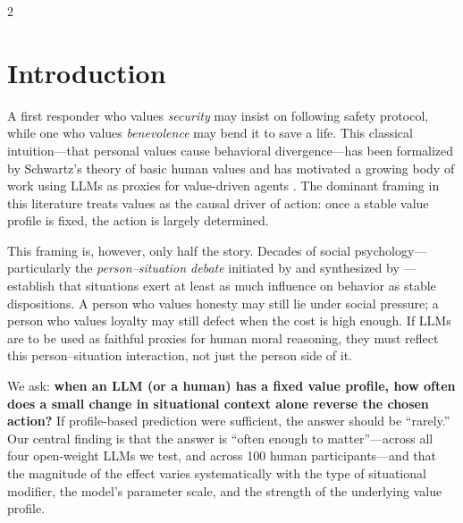 \documentclass[11pt]{article}
\begin{document}
\begin{multicols}{2}

\section{Introduction}
\label{sec:intro}

A first responder who values \emph{security} may insist on following safety protocol, while one who values \emph{benevolence} may bend it to save a life. This classical intuition---that personal values cause behavioral divergence---has been formalized by Schwartz's theory of basic human values \citep{schwartz1992universals, schwartz2012refined} and has motivated a growing body of work using LLMs as proxies for value-driven agents \citep{sorensen2024value, kang2023values, abdulhai2023moral, vista2025}. The dominant framing in this literature treats values as the causal driver of action: once a stable value profile is fixed, the action is largely determined.

This framing is, however, only half the story. Decades of social psychology---particularly the \emph{person--situation debate} initiated by \citet{mischel1968personality} and synthesized by \citet{ross1991person}---establish that situations exert at least as much influence on behavior as stable dispositions. A person who values honesty may still lie under social pressure; a person who values loyalty may still defect when the cost is high enough. If LLMs are to be used as faithful proxies for human moral reasoning, they must reflect this person--situation interaction, not just the person side of it.

We ask: \textbf{when an LLM (or a human) has a fixed value profile, how often does a small change in situational context alone reverse the chosen action?} If profile-based prediction were sufficient, the answer should be ``rarely.'' Our central finding is that the answer is ``often enough to matter''---across all four open-weight LLMs we test, and across 100 human participants---and that the magnitude of the effect varies systematically with the type of situational modifier, the model's parameter scale, and the strength of the underlying value profile.


\end{multicols}
\end{document}
